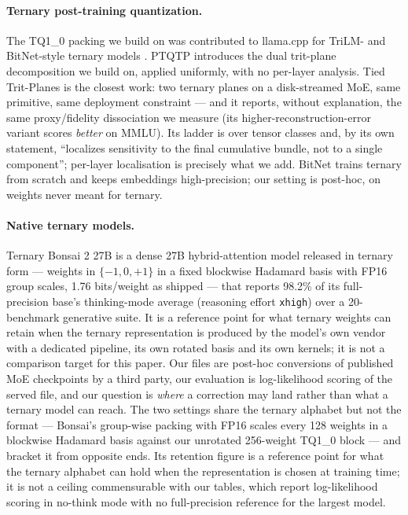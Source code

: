 \documentclass[10pt]{article} %
\begin{document}
\paragraph{Ternary post-training quantization.} The TQ1\_0 packing we build on
was contributed to llama.cpp for TriLM- and BitNet-style ternary models
\citep{compilade2024tq1}. PTQTP \citep{xiao2025ptqtp} introduces
the dual trit-plane decomposition we build on, applied uniformly, with no
per-layer analysis. Tied Trit-Planes \citep{grella2026tiedtritplanes} is the closest work:
two ternary planes on a disk-streamed MoE, same primitive, same deployment
constraint --- and it reports, without explanation, the same proxy/fidelity
dissociation we measure (its higher-reconstruction-error variant scores
\emph{better} on MMLU). Its ladder is over tensor classes and, by its own
statement, ``localizes sensitivity to the final cumulative bundle, not to a
single component''; per-layer localisation is precisely what we add. BitNet
\citep{ma2024bitnet} trains ternary from scratch and keeps embeddings
high-precision; our setting is post-hoc, on weights never meant for ternary.

\paragraph{Native ternary models.} Ternary Bonsai 2 27B
\citep{prismml2026bonsai2} is a dense 27B hybrid-attention model released in
ternary form --- weights in $\{-1, 0, +1\}$ in a fixed blockwise Hadamard basis
with FP16 group scales, 1.76 bits/weight as shipped --- that reports 98.2\% of
its full-precision base's thinking-mode average (reasoning effort
\texttt{xhigh}) over a 20-benchmark generative suite. It is
a reference point for what ternary weights can retain when the ternary
representation is produced by the model's own vendor with a dedicated
pipeline, its own rotated basis and its own kernels; it is not a comparison
target for this paper. Our files are post-hoc conversions of published MoE
checkpoints by a third party, our evaluation is log-likelihood scoring of the
served file, and our question is \emph{where} a correction may land rather
than what a ternary model can reach. The two settings share the ternary
alphabet but not the format --- Bonsai's group-wise packing with FP16 scales
every 128 weights in a blockwise Hadamard basis against our unrotated
256-weight TQ1\_0 block --- and bracket it from opposite ends. Its retention
figure is a reference point for what the ternary alphabet can hold when the
representation is chosen at training time; it is not a ceiling commensurable
with our tables, which report log-likelihood scoring in no-think mode with no
full-precision reference for the largest model.
\end{document}

